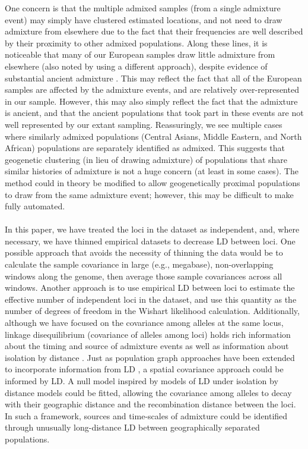 \documentclass[10pt,letterpaper]{article}
\providecommand{\DIFadd}[1]{{\protect\color{blue}\uwave{#1}}} %
\providecommand{\DIFaddbegin}{} %
\providecommand{\DIFaddend}{} %
\begin{document}
One concern is that the multiple admixed samples (from a single admixture event) may simply have clustered estimated locations, 
and not need to draw admixture from elsewhere due to the fact that their frequencies are well described by their proximity to other admixed populations.  
Along these lines, it is noticeable that many of our European samples draw little admixture from elsewhere (also noted by \cite{Hellenthal} using a different approach), 
despite evidence of substantial ancient admixture \cite{lazaridis_ancient_2014}.
This may reflect the fact that all of the European samples are affected by the admixture events, and are relatively over-represented in our sample. 
However, this may also simply reflect the fact that the admixture is ancient, 
and that the ancient populations that took part in these events are not well represented by our extant sampling. 
Reassuringly, we see multiple cases where similarly admixed populations (Central Asians, Middle Eastern, and North African) 
populations are separately identified as admixed. 
This suggests that geogenetic clustering (in lieu of drawing admixture) of populations that share similar histories of admixture is not a huge concern 
(at least in some cases). 
The method could in theory be modified to allow geogenetically proximal populations to draw from the same admixture event;
however, this may be difficult to make fully automated.

\DIFaddbegin \paragraph{\DIFadd{Linkage Between Loci}}
\DIFaddend In this paper, we have treated the loci in the dataset as independent, and,
where necessary, we have thinned empirical datasets to decrease LD between loci.
One possible approach that avoids the necessity of thinning the data would be to 
calculate the sample covariance in large (e.g., megabase), non-overlapping windows along the genome,
then average those sample covariances across all windows.
Another approach is to use empirical LD between loci to estimate the effective number of independent
loci in the dataset, and use this quantity as the number of degrees of freedom in the Wishart likelihood calculation.
Additionally, although we have focused on the covariance among alleles at the same locus, 
linkage disequilibrium (covariance of alleles among loci) 
holds rich information about the timing and source of admixture events \cite{chakraborty_admixture_1988,moorjani_india_2013, Hellenthal,gravel_population_2012} 
as well as information about isolation by distance \cite{ralph2013geography}.
Just as population graph approaches have been extended to incorporate information from LD \cite{Loh:13}, 
a spatial covariance approach could be informed by LD. 
A null model inspired by models of LD under isolation by distance models \cite{Arkendra2007,Barton2013} could be fitted, 
allowing the covariance among alleles to decay with their geographic distance and the recombination distance between the loci. 
In such a framework, sources and time-scales of admixture could be identified through unusually long-distance LD between geographically separated populations. 
\end{document}
